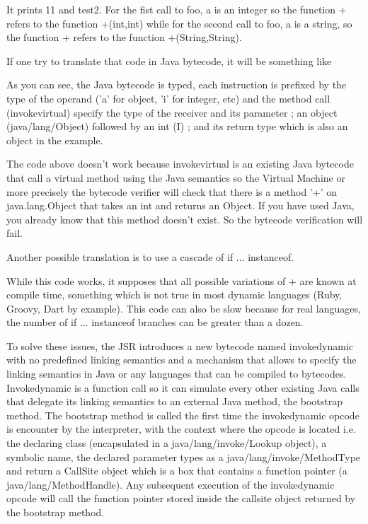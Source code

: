 \documentclass{sigplanconf}
\def \Jsr{JSR\xspace}
\begin{document}
      It prints 11 and test2. For the fist call to foo, a is an integer so the function + refers
      to the function +(int,int) while for the second call to foo, a is a string, so the
      function + refers to the function +(String,String).

      If one try to translate that code in Java bytecode, it will be something like

      

      As you can see, the Java bytecode is typed, each instruction is prefixed 
      by the type of the operand ('a' for object, 'i' for integer, etc)
      and the method call (invokevirtual) specify the type of the receiver and its parameter ;
      an object (java/lang/Object) followed by an int (I) ; and its return type
      which is also an object in the example.

      The code above doesn't work because invokevirtual is an existing Java bytecode that call
      a virtual method using the Java semantics so the Virtual Machine or more precisely
      the bytecode verifier will check that there is a method '+' on java.lang.Object
      that takes an int and returns an Object. If you have used Java, you already know
      that this method doesn't exist. So the bytecode verification will fail.

      Another possible translation is to use a cascade of if ... instanceof.

      

      While this code works, it supposes that all possible variations of + are known at compile time,
      something which is not true in most dynamic languages (Ruby, Groovy, Dart by example).
      This code can also be slow because for real languages, the number of if ... instanceof branches
      can be greater than a dozen. 
      
      To solve these issues, the \Jsr introduces a new bytecode named invokedynamic with no predefined
      linking semantics and a mechanism that allows to specify the linking semantics in Java
      or any languages that can be compiled to bytecodes.
      Invokedynamic is a function call so it can simulate every other existing Java calls that delegate
      its linking semantics to an external Java method, the bootstrap method.
      The bootstrap method is called the first time the invokedynamic opcode is encounter by the interpreter,
      with the context where the opcode is located i.e.
      the declaring class (encapsulated in a java/lang/invoke/Lookup object), a symbolic name,
      the declared parameter types as a java/lang/invoke/MethodType and return
      a CallSite object which is a box that contains a function pointer (a java/lang/MethodHandle).
      Any subsequent execution of the invokedynamic opcode will call the function pointer
      stored inside the callsite object returned by the bootstrap method.
      
\end{document}
